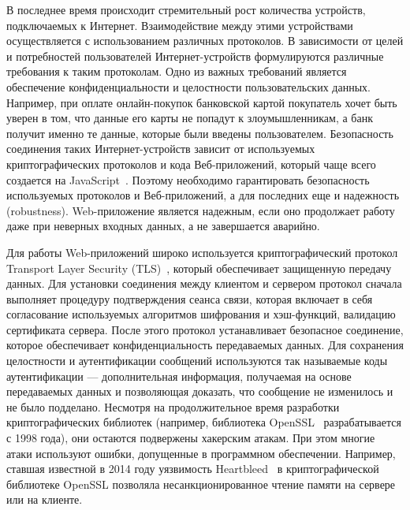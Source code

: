 В последнее время происходит стремительный рост количества устройств, подключаемых к Интернет. Взаимодействие между этими устройствами осуществляется с использованием различных протоколов. В зависимости от целей и потребностей пользователей Интернет-устройств формулируются различные требования к таким протоколам. Одно из важных требований является обеспечение конфиденциальности и целостности пользовательских данных. Например, при оплате онлайн-покупок банковской картой покупатель хочет быть уверен в том, что данные его карты не попадут к злоумышленникам, а банк получит именно те данные, которые были введены пользователем. Безопасность соединения таких Интернет-устройств зависит от используемых криптографических протоколов и кода Веб-приложений, который чаще всего создается на JavaScript~\cite{js_semantics}. Поэтому необходимо гарантировать безопасность используемых протоколов и Веб-приложений, а для последних еще и надежность (robustness). Web-приложение является надежным, если оно продолжает работу даже при неверных входных данных, а не завершается аварийно. 

Для работы Web-приложений широко используется криптографический протокол Transport Layer Security (TLS)~\cite{tls}, который обеспечивает защищенную передачу данных. Для установки соединения между клиентом и сервером протокол сначала выполняет процедуру подтверждения сеанса связи, которая включает в себя согласование используемых алгоритмов шифрования и хэш-функций, валидацию сертификата сервера. После этого протокол устанавливает безопасное соединение, которое обеспечивает конфиденциальность передаваемых данных. Для сохранения целостности и аутентификации сообщений используются так называемые коды аутентификации --- дополнительная  информация, получаемая на основе передаваемых данных и позволяющая доказать, что сообщение не изменилось и не было подделано. Несмотря на продолжительное время разработки криптографических библиотек (например, библиотека OpenSSL~\cite{openssl} разрабатывается с 1998 года), они остаются подвержены хакерским атакам. При этом многие атаки используют ошибки, допущенные в программном обеспечении. Например, ставшая известной в  2014 году уязвимость Heartbleed~\cite{heartbleed} в криптографической библиотеке OpenSSL позволяла несанкционированное чтение памяти на сервере или на клиенте.

